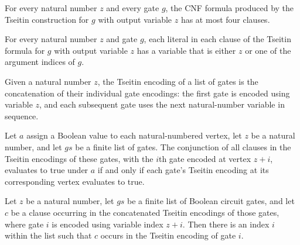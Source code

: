 \begin{theorem}
\label{BoolCircuit.DAGGate.length_tseitin_le}
\leanok
{}
For every natural number $z$ and every gate $g$, the CNF formula produced by the Tseitin
construction for $g$ with output variable $z$ has at most four clauses.
\end{theorem}

\begin{theorem}
\label{BoolCircuit.DAGGate.var_mem_of_mem_tseitin}
\leanok
{}
For every natural number $z$ and gate $g$, each literal in each clause of the Tseitin
formula for $g$ with output variable $z$ has a variable that is either $z$ or one of the
argument indices of $g$.
\end{theorem}

\begin{definition}
\label{BoolCircuit.tseitinGates}
\leanok
{}
Given a natural number $z$, the Tseitin encoding of a list of gates is the concatenation
of their individual gate encodings: the first gate is encoded using variable $z$, and
each subsequent gate uses the next natural-number variable in sequence.
\end{definition}

\begin{theorem}
\label{BoolCircuit.eval_tseitinGates}
\leanok
{}
Let $a$ assign a Boolean value to each natural-numbered vertex, let $z$ be a natural
number, and let $gs$ be a finite list of gates. The conjunction of all clauses in the
Tseitin encodings of these gates, with the $i$th gate encoded at vertex $z+i$, evaluates
to true under $a$ if and only if each gate's Tseitin encoding at its corresponding
vertex evaluates to true.
\end{theorem}

\begin{theorem}
\label{BoolCircuit.exists_of_mem_tseitinGates}
\leanok
{}
Let $z$ be a natural number, let $gs$ be a finite list of Boolean circuit gates, and let
$c$ be a clause occurring in the concatenated Tseitin encodings of those gates, where
gate $i$ is encoded using variable index $z+i$. Then there is an index $i$ within the
list such that $c$ occurs in the Tseitin encoding of gate $i$.
\end{theorem}

